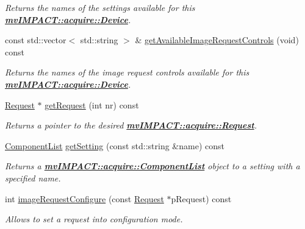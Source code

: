 \begin{DoxyCompactItemize}
\begin{DoxyCompactList}\small\item\em Returns the names of the settings available for this {\bfseries \hyperlink{classmv_i_m_p_a_c_t_1_1acquire_1_1_device}{mv\+I\+M\+P\+A\+C\+T\+::acquire\+::\+Device}}. \end{DoxyCompactList}\item 
const std\+::vector$<$ std\+::string $>$ \& \hyperlink{classmv_i_m_p_a_c_t_1_1acquire_1_1_function_interface_a5e9a808de6c96158960cbdcc7dcf7734}{get\+Available\+Image\+Request\+Controls} (void) const 
\begin{DoxyCompactList}\small\item\em Returns the names of the image request controls available for this {\bfseries \hyperlink{classmv_i_m_p_a_c_t_1_1acquire_1_1_device}{mv\+I\+M\+P\+A\+C\+T\+::acquire\+::\+Device}}. \end{DoxyCompactList}\item 
\hyperlink{classmv_i_m_p_a_c_t_1_1acquire_1_1_request}{Request} $\ast$ \hyperlink{classmv_i_m_p_a_c_t_1_1acquire_1_1_function_interface_afea62dee2bda1b47c24821f9121c5505}{get\+Request} (int nr) const 
\begin{DoxyCompactList}\small\item\em Returns a pointer to the desired {\bfseries \hyperlink{classmv_i_m_p_a_c_t_1_1acquire_1_1_request}{mv\+I\+M\+P\+A\+C\+T\+::acquire\+::\+Request}}. \end{DoxyCompactList}\item 
\hyperlink{classmv_i_m_p_a_c_t_1_1acquire_1_1_component_list}{Component\+List} \hyperlink{classmv_i_m_p_a_c_t_1_1acquire_1_1_function_interface_aa34c97fc5e13bd6c5e4bd0f81d614fa2}{get\+Setting} (const std\+::string \&name) const 
\begin{DoxyCompactList}\small\item\em Returns a {\bfseries \hyperlink{classmv_i_m_p_a_c_t_1_1acquire_1_1_component_list}{mv\+I\+M\+P\+A\+C\+T\+::acquire\+::\+Component\+List}} object to a setting with a specified name. \end{DoxyCompactList}\item 
int \hyperlink{classmv_i_m_p_a_c_t_1_1acquire_1_1_function_interface_a05594ac5b54679152d27ac0e73b3908e}{image\+Request\+Configure} (const \hyperlink{classmv_i_m_p_a_c_t_1_1acquire_1_1_request}{Request} $\ast$p\+Request) const 
\begin{DoxyCompactList}\small\item\em Allows to set a request into configuration mode. \end{DoxyCompactList}\item 

\end{DoxyCompactItemize}
